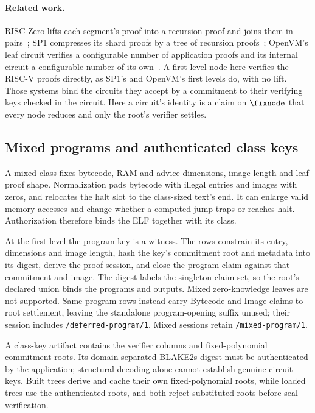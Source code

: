\paragraph{Related work.} RISC Zero lifts each segment's proof into a recursion proof and joins them in pairs~\cite{BG23}; SP1 compresses its shard proofs by a tree of recursion proofs~\cite{SP1}; OpenVM's leaf circuit verifies a configurable number of application proofs and its internal circuit a configurable number of its own~\cite{OpenVM}. A first-level node here verifies the RISC-V proofs directly, as SP1's and OpenVM's first levels do, with no lift. Those systems bind the circuits they accept by a commitment to their verifying keys checked in the circuit. Here a circuit's identity is a claim on $\fixnode$ that every node reduces and only the root's verifier settles.

\subsection{Mixed programs and authenticated class keys}

A mixed class fixes bytecode, RAM and advice dimensions, image length and leaf proof shape. Normalization pads bytecode with illegal entries and images with zeros, and relocates the halt slot to the class-sized text's end. It can enlarge valid memory accesses and change whether a computed jump traps or reaches halt. Authorization therefore binds the ELF together with its class.

At the first level the program key is a witness. The rows constrain its entry, dimensions and image length, hash the key's commitment root and metadata into its digest, derive the proof session, and close the program claim against that commitment and image. The digest labels the singleton claim set, so the root's declared union binds the programs and outputs. Mixed zero-knowledge leaves are not supported. Same-program rows instead carry Bytecode and Image claims to root settlement, leaving the standalone program-opening suffix unused; their session includes \texttt{/deferred-program/1}. Mixed sessions retain \texttt{/mixed-program/1}.

A class-key artifact contains the verifier columns and fixed-polynomial commitment roots. Its domain-separated BLAKE2s digest must be authenticated by the application; structural decoding alone cannot establish genuine circuit keys. Built trees derive and cache their own fixed-polynomial roots, while loaded trees use the authenticated roots, and both reject substituted roots before seal verification.

